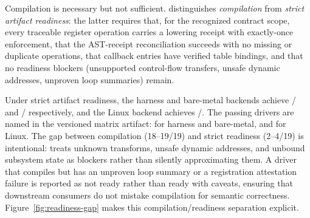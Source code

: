 Compilation is necessary but not sufficient. \reharness{} distinguishes
\emph{compilation} from \emph{strict artifact readiness}: the latter requires
that, for the recognized contract scope,
every traceable register operation carries a lowering receipt with exactly-once
enforcement, that the AST-receipt reconciliation succeeds with no missing or
duplicate operations, that callback entries have verified table bindings,
and that no readiness blockers (unsupported control-flow transfers, unsafe
dynamic addresses, unproven loop summaries) remain.

Under strict artifact readiness, the harness and bare-metal backends achieve
\HarnessReadyCount{}/\EvalDrivers{} and \BaremetalReadyCount{}/\EvalDrivers{}
respectively, and the Linux backend achieves \LinuxReadyCount{}/\EvalDrivers{}.
The passing drivers are named in the versioned matrix artifact:
\HarnessReadyDriverList{} for harness and bare-metal, and
\LinuxReadyDriverList{} for Linux.
The gap between compilation (18--19/19) and strict readiness (2--4/19) is
intentional: \reharness{} treats unknown transforms, unsafe dynamic addresses,
and unbound subsystem state as blockers rather than silently approximating
them. A driver that compiles but has an unproven loop summary or a
registration attestation failure is reported as not ready rather than
ready with caveats, ensuring that downstream consumers do not mistake
compilation for semantic correctness.
Figure~\ref{fig:readiness-gap} makes this compilation/readiness separation
explicit.

